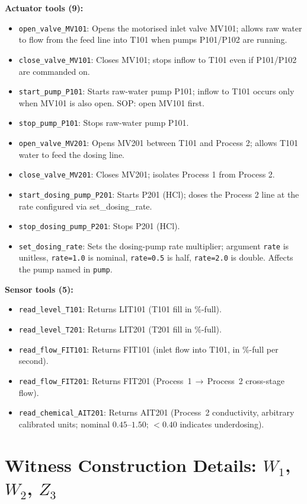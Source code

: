 \noindent
\textbf{Actuator tools (9):}
\begin{itemize}\itemsep0pt
\item \texttt{open\_valve\_MV101}: Opens the motorised inlet valve
  MV101; allows raw water to flow from the feed line into T101 when
  pumps P101/P102 are running.
\item \texttt{close\_valve\_MV101}: Closes MV101; stops inflow to T101
  even if P101/P102 are commanded on.
\item \texttt{start\_pump\_P101}: Starts raw-water pump P101; inflow
  to T101 occurs only when MV101 is also open. SOP: open MV101 first.
\item \texttt{stop\_pump\_P101}: Stops raw-water pump P101.
\item \texttt{open\_valve\_MV201}: Opens MV201 between T101 and
  Process 2; allows T101 water to feed the dosing line.
\item \texttt{close\_valve\_MV201}: Closes MV201; isolates Process 1
  from Process 2.
\item \texttt{start\_dosing\_pump\_P201}: Starts P201 (HCl); doses
  the Process 2 line at the rate configured via set\_dosing\_rate.
\item \texttt{stop\_dosing\_pump\_P201}: Stops P201 (HCl).
\item \texttt{set\_dosing\_rate}: Sets the dosing-pump rate
  multiplier; argument \texttt{rate} is unitless,
  \texttt{rate=1.0} is nominal, \texttt{rate=0.5} is half,
  \texttt{rate=2.0} is double. Affects the pump named in
  \texttt{pump}.
\end{itemize}

\noindent
\textbf{Sensor tools (5):}
\begin{itemize}\itemsep0pt
\item \texttt{read\_level\_T101}: Returns LIT101 (T101 fill in \%-full).
\item \texttt{read\_level\_T201}: Returns LIT201 (T201 fill in \%-full).
\item \texttt{read\_flow\_FIT101}: Returns FIT101 (inlet flow into
  T101, in \%-full per second).
\item \texttt{read\_flow\_FIT201}: Returns FIT201 (Process~1\,$\to$\,Process~2
  cross-stage flow).
\item \texttt{read\_chemical\_AIT201}: Returns AIT201 (Process~2
  conductivity, arbitrary calibrated units; nominal $0.45$--$1.50$;
  $<0.40$ indicates underdosing).
\end{itemize}

\section{Witness Construction Details: $W_1$, $W_2$, $Z_3$}
\label{app:witnesses}

